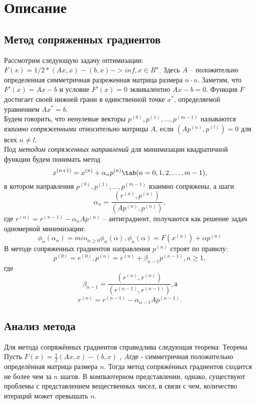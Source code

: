 \graphicspath{{png/}}

\section{Описание}

\subsection*{Метод сопряженных градиентов}

Рассмотрим следующую задачу оптимизации: $F(x) = 1/2 * (Ax, x) - (b, x) -> inf, x \in R^n$. Здесь $A$ -- положительно определенная симметричная разреженная матрица размера $n \cdot n$. Заметим, что $F'(x) = Ax - b$ и условие $F'(x) = 0$ эквивалентно $Ax - b = 0$. Функция $F$ достигает своей нижней грани в единственной точке $x^*$, определяемой уравнением $Ax^* = b$.
\\ Будем говорить, что ненулевые векторы $p^{(0)}, p^{(1)}, \dots, p^{(m - 1)}$ называются {\it взаимно сопряженными} относительно матрицы $A$, если $(Ap^{(n)}, p^{(l)}) = 0$ для всех $n \neq l$.
\\ Под {\it методом сопряженных направлений} для минимизации квадратичной функции будем понимать метод
$$x^{(n + 1)} = x^{(n)} + \alpha_{n}p^{(n)} \tab (n = 0, 1, 2, \dots, m - 1),$$
в котором направления $p^{(0)}, p^{(1)}, \dots, p^{(m - 1)}$ взаимно сопряжены, а шаги
$$\alpha_{n} = \frac{(r^{(n)}, p^{(n)})}{(Ap^{(n)}, p^{(n)})},$$ где  $r^{(n)} = r^{(n-1)} - \alpha_nAp^{(n)}$ -- антиградиент, получаются как решение задач одномерной минимизации: 
$$\phi_n(\alpha_n) = min_{\alpha \geq 0} \phi_n(\alpha), \phi_n(\alpha) = F(x^{(n)}) + \alpha p^{(n)} $$
В методе сопряженных градиентов направления $p^{(n)}$ строят по правилу: 
$$p^{(0)} = r^{(0)}, p^{(n)} = r^{(n)} + \beta_{n-1}p^{(n-1)}, n \geq 1, $$ где $$\beta_{n-1} = \frac{(r^{(n)}, r^{(n)})}{(r^{(n-1)}, r^{(n-1)})} , а$$ $$r^{(n)} = r^{(n - 1)} - \alpha_{n-1}Ap^{(n - 1)} .$$
\subsection*{Анализ метода}
Для метода сопряжённых градиентов справедлива следующая теорема:
Теорема Пусть $F(x) = \frac{1}{2}  (Ax, x) - (b, x)$ ,  $A$где - симметричная положительно определённая матрица размера $n$. Тогда метод сопряжённых градиентов сходится не более чем за $n$ шагов. В компьютерном представлении, однако, существуют проблемы с представлением вещественных чисел, в связи с чем, количество итераций может превышать $n$. 
